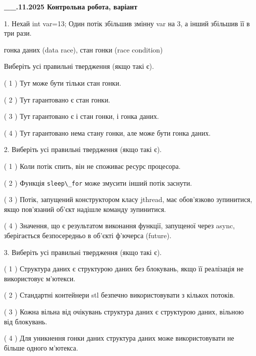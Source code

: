 \documentclass[12pt, ukrainian]{article}
\def\code#1{\Verb!#1!}
\begin{document}
\newpage
\begin {large}

\textbf{\_\_.11.2025 Контрольна робота, варіант  }\par


{
1. Нехай int var=13; Один потік збільшив змінну var на 3, а інший збільшив її в три рази.

гонка даних (data race), стан гонки (race condition)

Виберіть усі правильні твердження (якщо такі є).\par
\vspace{2mm}
( 1 ) Тут може бути тільки стан гонки.%

( 2 ) Тут гарантовано є стан гонки.%

( 3 ) Тут гарантовано є і стан гонки, і гонка даних.%

( 4 ) Тут гарантовано нема стану гонки, але може бути гонка даних.%


2. Виберіть усі правильні твердження (якщо такі є).\par
\vspace{2mm}

( 1 ) Коли потік спить, він не споживає ресурс процесора.%

( 2 ) Функція \code{sleep\_for} може змусити інший потік заснути.%

( 3 ) Потік, запущений конструктором класу jthread, має обов’язково зупинитися, якщо пов’язаний об’єкт надішле команду зупинитися.%

( 4 ) Значення, що є результатом виконання функції, запущеної через async, зберігається безпосередньо в об’єкті ф’ючерса (future).%


3. Виберіть усі правильні твердження (якщо такі є).\par
\vspace{2mm}

( 1 ) Структура даних є структурою даних без блокувань, якщо її реалізація не використовує м’ютекси.%

( 2 ) Стандартні контейнери stl безпечно використовувати з кількох потоків.%

( 3 ) Кожна вільна від очікувань структура даних є структурою даних, вільною від блокувань.%

( 4 ) Для уникнення гонки даних структура даних може використовувати не більше одного м’ютекса.%


}
\end{large}
\end{document}
